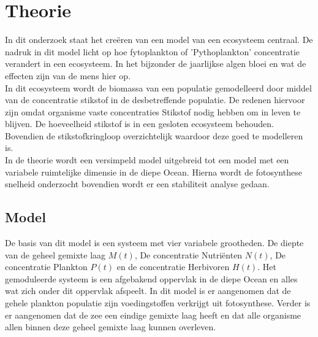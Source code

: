 \section{Theorie}
In dit onderzoek staat het creëren van een model van een ecosysteem centraal. De nadruk in dit model licht op hoe fytoplankton of 'Pythoplankton' concentratie verandert in een ecosysteem. In het bijzonder de jaarlijkse algen bloei en wat de effecten zijn van de mens hier op.\\

In dit ecosysteem wordt de biomassa van een populatie gemodelleerd door middel van de concentratie stikstof in de desbetreffende populatie. De redenen hiervoor zijn omdat  organisme vaste concentraties Stikstof nodig hebben om in leven te blijven. De hoeveelheid stikstof is in een gesloten ecosysteem behouden. Bovendien de stikstofkringloop overzichtelijk waardoor deze goed te modelleren is.\\

In de theorie wordt een versimpeld model uitgebreid tot een model met een variabele ruimtelijke dimensie in de diepe Ocean. Hierna wordt de fotosynthese snelheid onderzocht bovendien wordt er een stabiliteit analyse gedaan.

\subsection{Model}
De basis van dit model is een systeem met vier variabele grootheden. De diepte van de geheel gemixte laag $M(t)$, De concentratie Nutriënten $N(t)$, De concentratie Plankton $P(t)$ en de concentratie Herbivoren $H(t)$. Het gemoduleerde systeem is een afgebakend oppervlak in de diepe Ocean en alles wat zich onder dit oppervlak afspeelt. In dit model is er aangenomen dat de gehele plankton populatie zijn voedingstoffen verkrijgt uit fotosynthese. Verder is er aangenomen dat de zee een eindige gemixte laag heeft en dat alle organisme allen binnen deze geheel gemixte laag kunnen overleven.

